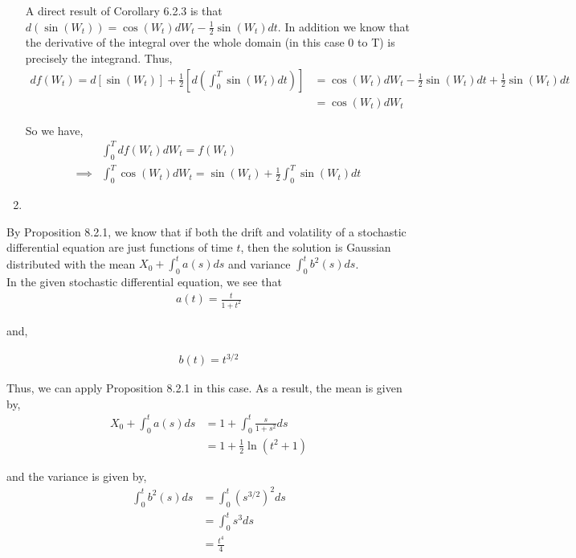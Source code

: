\documentclass[12pt]{article}
\newenvironment{problem}[2][Problem]{\begin{trivlist}
\item[\hskip \labelsep {\bfseries #1}\hskip \labelsep {\bfseries #2.}]}{\end{trivlist}}
\begin{document}
\begin{enumerate}[\alph*)]
A direct result of Corollary 6.2.3 is that $d(\sin(W_t)) = \cos(W_t)dW_t - \frac{1}{2}\sin(W_t)dt$. In addition we know that the derivative of the integral over the whole domain (in this case 0 to T) is precisely the integrand. Thus,
\begin{align*}
d f(W_t) = d\left[\sin(W_t)\right] + \frac{1}{2} \left[ d\left(\int_0^T \sin(W_t)dt\right) \right] &= \cos(W_t)dW_t - \frac{1}{2}\sin(W_t)dt + \frac{1}{2}\sin(W_t)dt\\
&= \cos(W_t)dW_t
\end{align*}

So we have,
\begin{align*}
&\int_{0}^T df(W_t) dW_t = f(W_t)\\
\implies &\int_0^T \cos(W_t)dW_t = \sin(W_t) + \frac{1}{2} \int_0^T \sin(W_t) dt
\end{align*}

\item

\end{enumerate}

\begin{problem}{24}
\end{problem}

By Proposition 8.2.1, we know that if both the drift and volatility of a stochastic differential equation are just functions of time $t$, then the solution is Gaussian distributed with the mean $X_0 + \int_0^t a(s) ds$ and variance $\int_0^t b^2(s) ds$.\\

In the given stochastic differential equation, we see that
\begin{align*}
a(t) = \frac{t}{1+t^2}
\end{align*}

and,

\begin{align*}
b(t) = t^{3/2}
\end{align*}

Thus, we can apply Proposition 8.2.1 in this case. As a result, the mean is given by,
\begin{align*}
X_0 + \int_0^t a(s) ds &= 1 + \int_0^t \frac{s}{1 + s^2} ds\\
&= 1 + \frac{1}{2}\ln(t^2+1)
\end{align*}

and the variance is given by,
\begin{align*}
\int_0^t b^2(s) ds &= \int_0^t \left(s^{3/2}\right)^2 ds\\
&= \int_0^t s^3 ds\\
&= \frac{t^4}{4}
\end{align*}
\end{document}
